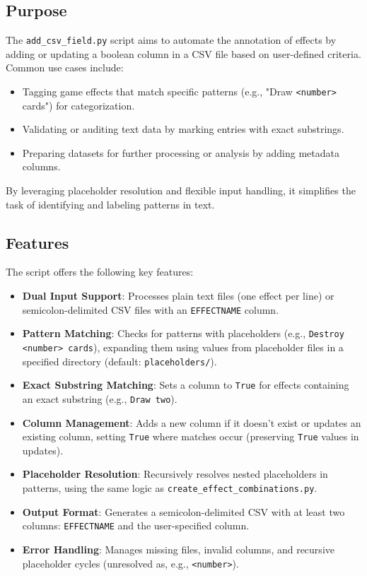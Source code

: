 \subsection{Purpose}
The \texttt{add\_csv\_field.py} script aims to automate the annotation of effects by adding or updating a boolean column in a CSV file based on user-defined criteria. Common use cases include:
\begin{itemize}
    \item Tagging game effects that match specific patterns (e.g., "Draw \texttt{<number>} cards") for categorization.
    \item Validating or auditing text data by marking entries with exact substrings.
    \item Preparing datasets for further processing or analysis by adding metadata columns.
\end{itemize}
By leveraging placeholder resolution and flexible input handling, it simplifies the task of identifying and labeling patterns in text.

\subsection{Features}
The script offers the following key features:
\begin{itemize}
    \item \textbf{Dual Input Support}: Processes plain text files (one effect per line) or semicolon-delimited CSV files with an \texttt{EFFECTNAME} column.
    \item \textbf{Pattern Matching}: Checks for patterns with placeholders (e.g., \texttt{Destroy <number> cards}), expanding them using values from placeholder files in a specified directory (default: \texttt{placeholders/}).
    \item \textbf{Exact Substring Matching}: Sets a column to \texttt{True} for effects containing an exact substring (e.g., \texttt{Draw two}).
    \item \textbf{Column Management}: Adds a new column if it doesn’t exist or updates an existing column, setting \texttt{True} where matches occur (preserving \texttt{True} values in updates).
    \item \textbf{Placeholder Resolution}: Recursively resolves nested placeholders in patterns, using the same logic as \texttt{create\_effect\_combinations.py}.
    \item \textbf{Output Format}: Generates a semicolon-delimited CSV with at least two columns: \texttt{EFFECTNAME} and the user-specified column.
    \item \textbf{Error Handling}: Manages missing files, invalid columns, and recursive placeholder cycles (unresolved as, e.g., \texttt{<number>}).
\end{itemize}

